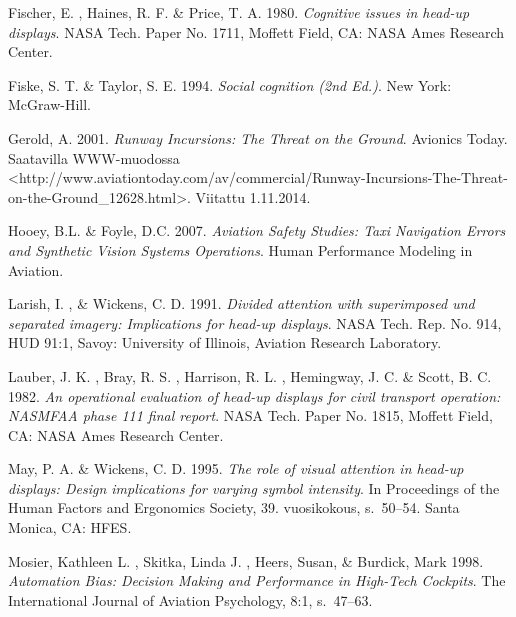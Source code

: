 \documentclass[utf8,bachelor,manualbib]{gradu3}
\begin{document}
\begin{thebibliography}{}
Fischer, E. , Haines, R. F. \& Price, T. A. 1980.
\textit{Cognitive issues in head-up displays}.
NASA Tech. Paper No. 1711, Moffett Field, CA: NASA Ames Research Center.

Fiske, S. T. \& Taylor, S. E. 1994.
\textit{Social cognition (2nd Ed.)}.
New York: McGraw-Hill.

Gerold, A. 2001.
\textit{Runway Incursions: The Threat on the Ground}.
Avionics Today.
Saatavilla WWW-muodossa
<http://www.aviationtoday.com/av/commercial/Runway-Incursions-The-Threat-on-the-Ground\_12628.html>. Viitattu 1.11.2014.

Hooey, B.L. \& Foyle, D.C. 2007.
\textit{Aviation Safety Studies: Taxi Navigation Errors and Synthetic Vision Systems Operations}.
Human Performance Modeling in Aviation.

Larish, I. , \& Wickens, C. D. 1991.
\textit{Divided attention with superimposed und separated imagery: Implications for head-up displays}.
NASA Tech. Rep. No. 914, HUD 91:1, Savoy: University of Illinois, Aviation Research Laboratory.

Lauber, J. K. , Bray, R. S. , Harrison, R. L. , Hemingway, J. C. \& Scott, B. C. 1982.
\textit{An operational evaluation of head-up displays for civil transport operation: NASMFAA phase 111 final report}.
NASA Tech. Paper No. 1815, Moffett Field, CA: NASA Ames Research Center.

May, P. A. \& Wickens, C. D. 1995.
\textit{The role of visual attention in head-up displays: Design implications
for varying symbol intensity}.
In Proceedings of the Human Factors and Ergonomics Society, 39. vuosikokous, s.~50--54. Santa Monica, CA: HFES.

Mosier, Kathleen L. , Skitka, Linda J. , Heers, Susan, \& Burdick, Mark 1998.
\textit{Automation Bias: Decision Making and Performance in High-Tech Cockpits}.
The International Journal of Aviation Psychology, 8:1, s.~47--63.


\end{thebibliography}
\end{document}
